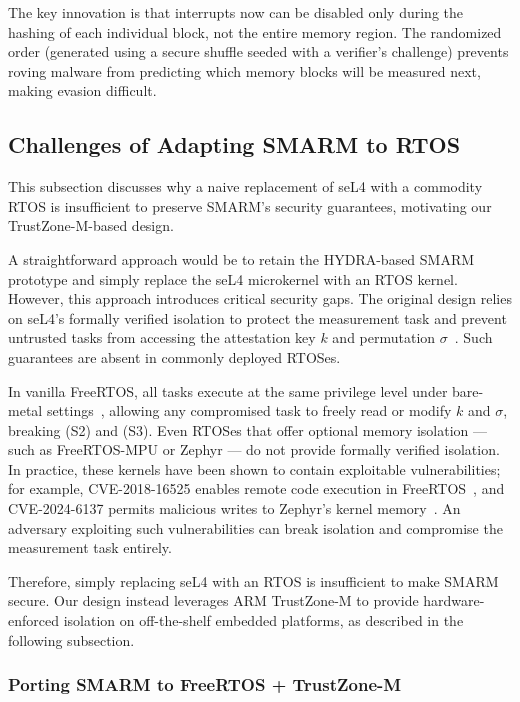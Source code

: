 \documentclass[a4paper,10pt]{article}
\begin{document}
{The key innovation is that interrupts now can be disabled only during the hashing of each individual block, not the entire memory region. 
The randomized order (generated using a secure shuffle seeded with a verifier's challenge) prevents roving malware from predicting which memory blocks will be measured next, making evasion difficult.


\subsection{Challenges of Adapting SMARM to RTOS}
\label{sec:smarm-challenges}

This subsection discusses why a naive replacement of seL4 
with a commodity RTOS is insufficient to preserve SMARM's 
security guarantees, motivating our TrustZone-M-based design.

A straightforward approach would be to retain the HYDRA-based 
SMARM prototype and simply replace the seL4 microkernel with 
an RTOS kernel. However, this approach introduces critical 
security gaps. The original design relies on seL4's formally 
verified isolation to protect the measurement task and prevent 
untrusted tasks from accessing the attestation key $k$ and 
permutation $\sigma$~\cite{eldefrawy2017hydra}. Such guarantees are 
absent in commonly deployed RTOSes.

In vanilla FreeRTOS, all tasks execute at the same privilege 
level under bare-metal settings~\cite{freertos2025}, allowing 
any compromised task to freely read or modify $k$ and 
$\sigma$, breaking (S2) and (S3). Even RTOSes that offer 
optional memory isolation — such as FreeRTOS-MPU or Zephyr — 
do not provide formally verified isolation. In practice, these 
kernels have been shown to contain exploitable vulnerabilities; 
for example, CVE-2018-16525 enables remote code execution in 
FreeRTOS~\cite{freertos_cve}, and CVE-2024-6137 permits 
malicious writes to Zephyr's kernel memory~\cite{zephyr_cve}. 
An adversary exploiting such vulnerabilities can break 
isolation and compromise the measurement task entirely.

Therefore, simply replacing seL4 with an RTOS is insufficient 
to make SMARM secure. Our design instead leverages ARM 
TrustZone-M to provide hardware-enforced isolation on 
off-the-shelf embedded platforms, as described in the 
following subsection.

\subsubsection{Porting SMARM to FreeRTOS + TrustZone-M}
\label{sec:porting}

}
\end{document}
